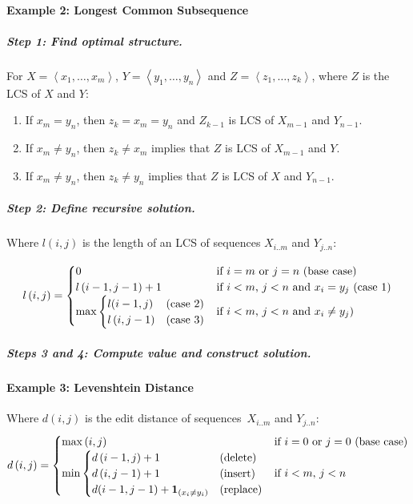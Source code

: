 \documentclass[twocolumn,english]{article}
\numberwithin{equation}{section}
\numberwithin{figure}{section}
\numberwithin{table}{section}
\begin{document}
\paragraph{Example 2: Longest Common Subsequence}


\subparagraph{Step 1: Find optimal structure.}

For $X=\left\langle x_{1},\dots,x_{m}\right\rangle $, $Y=\left\langle y_{1},\dots,y_{n}\right\rangle $
and $Z=\left\langle z_{1},\dots,z_{k}\right\rangle $, where $Z$
is the LCS of $X$ and $Y$: 
\begin{enumerate}
\item If $x_{m}=y_{n}$, then $z_{k}=x_{m}=y_{n}$ and $Z_{k-1}$ is LCS
of $X_{m-1}$ and $Y_{n-1}$. 
\item If $x_{m}\neq y_{n}$, then $z_{k}\neq x_{m}$ implies that $Z$ is
LCS of $X_{m-1}$ and $Y$. 
\item If $x_{m}\neq y_{n}$, then $z_{k}\neq y_{n}$ implies that $Z$ is
LCS of $X$ and $Y_{n-1}$. 
\end{enumerate}

\subparagraph{Step 2: Define recursive solution.}

Where $l\left(i,j\right)$ is the length of an LCS of sequences $X_{i..m}$
and $Y_{j..n}$:

\[
l\left(i,j\right)=\begin{cases}
0 & \text{if \ensuremath{i=m} or \ensuremath{j=n} (base case)}\\
l\left(i-1,j-1\right)+1 & \text{if \ensuremath{i<m}, \ensuremath{j<n} and \ensuremath{x_{i}=y_{j}} (case 1)}\\
\max\begin{cases}
l(i-1,j) & \text{(case 2)}\\
l\left(i,j-1\right) & \text{(case 3)}
\end{cases} & \text{if \ensuremath{i<m}, \ensuremath{j<n} and \ensuremath{x_{i}\neq y_{j}})}
\end{cases}
\]



\subparagraph{Steps 3 and 4: Compute value and construct solution.}


\paragraph{Example 3: Levenshtein Distance}

Where $d\left(i,j\right)$ is the edit distance of sequences~$X_{i..m}$
and $Y_{j..n}$: 
\[
d\left(i,j\right)=\begin{cases}
\max\left(i,j\right) & \text{if \ensuremath{i=0} or \ensuremath{j=0} (base case)}\\
\min\begin{cases}
d\left(i-1,j\right)+1 & \text{(delete)}\\
d\left(i,j-1\right)+1 & \text{(insert)}\\
d(i-1,j-1) + \textbf{1}_{(x_{i} \neq y_{i})} & \text{(replace)}
\end{cases} & \text{if \ensuremath{i<m}, \ensuremath{j<n}}\\
\end{cases}
\]
\end{document}
